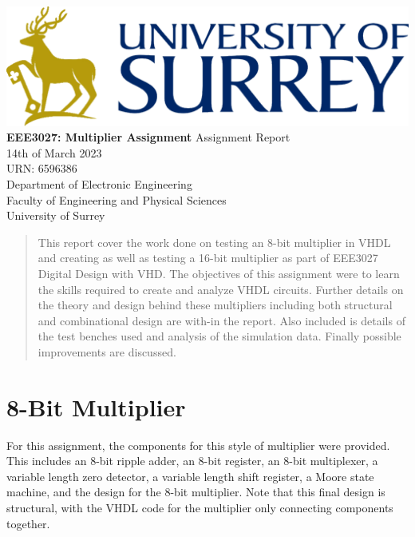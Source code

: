 \documentclass[11pt]{article}
\begin{document}
\begin{titlepage}
    \begin{center}
    \includegraphics[width=\textwidth]{Logo.png} %
    \vfill
    \Huge
    \textbf{EEE3027: Multiplier Assignment}
    \vfill
    \huge
    Assignment Report\\
    \vspace{1cm}
    \Large
    14th of March 2023\\
    URN: 6596386\\
    \vfill
    \vfill
    \Large
    Department of Electronic Engineering\\
    Faculty of Engineering and Physical Sciences\\
    University of Surrey\\
    \end{center}
\end{titlepage}

\begin{abstract}
This report cover the work done on testing an 8-bit multiplier in VHDL and creating as well as testing a 16-bit multiplier
as part of EEE3027 Digital Design with VHD.
The objectives of this assignment were to learn the skills required to create and analyze VHDL circuits. 
Further details on the theory and design behind these multipliers including both structural and combinational design are with-in the report. 
Also included is details of the test benches used and analysis of the simulation data.
Finally possible improvements are discussed.

\vspace{1cm}
\end{abstract}
\tableofcontents
\pagebreak

\section{8-Bit Multiplier}
For this assignment, the components for this style of multiplier were provided.
This includes an 8-bit ripple adder, an 8-bit register, an 8-bit multiplexer, a variable length zero detector, a variable length shift register, a Moore state machine,
and the design for the 8-bit multiplier.
Note that this final design is structural, with the VHDL code for the multiplier only connecting components together.
\end{document}
